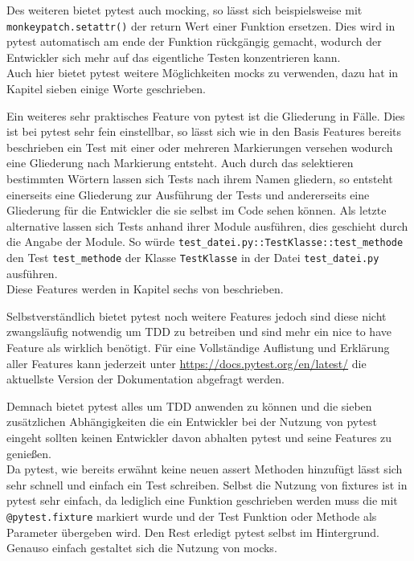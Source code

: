 Des weiteren bietet pytest auch \gls{mock}ing, so lässt sich beispielsweise mit
\lstinline{monkeypatch.setattr()} der return Wert einer Funktion ersetzen. Dies wird
in pytest automatisch am ende der Funktion rückgängig gemacht, wodurch der Entwickler
sich mehr auf das eigentliche Testen konzentrieren kann.
\newline
\\
Auch hier bietet pytest weitere Möglichkeiten \Glspl{mock} zu verwenden, dazu hat
\cite{docs.pytest.org:4.4} in Kapitel sieben einige Worte geschrieben.

Ein weiteres sehr praktisches Feature von pytest ist die Gliederung in Fälle. Dies ist bei pytest
sehr fein einstellbar, so lässt sich wie in den Basis Features bereits beschrieben ein Test mit
einer oder mehreren Markierungen versehen wodurch eine Gliederung nach Markierung entsteht. Auch
durch das selektieren bestimmten Wörtern lassen sich Tests nach ihrem Namen gliedern, so entsteht
einerseits eine Gliederung zur Ausführung der Tests und andererseits eine Gliederung für die
Entwickler die sie selbst im Code sehen können. Als letzte alternative lassen sich Tests anhand
ihrer Module ausführen, dies geschieht durch die Angabe der Module. So würde
\lstinline{test_datei.py::TestKlasse::test_methode} den Test \lstinline{test_methode} der Klasse
\lstinline{TestKlasse} in der Datei \lstinline{test_datei.py} ausführen.
\newline
\\
Diese Features werden in Kapitel sechs von \cite{docs.pytest.org:4.4} beschrieben.

Selbstverständlich bietet pytest noch weitere Features jedoch sind diese nicht zwangsläufig notwendig
um TDD zu betreiben und sind mehr ein nice to have Feature als wirklich benötigt. Für eine
Vollständige Auflistung und Erklärung aller Features kann jederzeit unter
\url{https://docs.pytest.org/en/latest/} die aktuellste Version der Dokumentation abgefragt werden.

Demnach bietet pytest alles um TDD anwenden zu können und die sieben zusätzlichen Abhängigkeiten
die ein Entwickler bei der Nutzung von pytest eingeht sollten keinen Entwickler davon abhalten
pytest und seine Features zu genießen.
\newline
\\
Da pytest, wie bereits erwähnt keine neuen assert Methoden hinzufügt lässt sich sehr schnell und
einfach ein Test schreiben. Selbst die Nutzung von \Glspl{fixture} ist in pytest sehr einfach, da
lediglich eine Funktion geschrieben werden muss die mit \lstinline{@pytest.fixture} markiert wurde
und der Test Funktion oder Methode als Parameter übergeben wird. Den Rest erledigt pytest selbst
im Hintergrund. Genauso einfach gestaltet sich die Nutzung von \Glspl{mock}.

